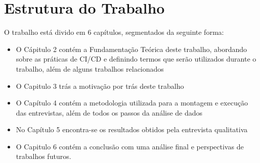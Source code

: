 \section{Estrutura do Trabalho}
 O trabalho está divido em 6 capítulos, segmentados da seguinte forma:

 \begin{itemize}
     \item O Cápitulo 2 contém a Fundamentação Teórica deste trabalho, abordando sobre as práticas de CI/CD e definindo termos que serão utilizados durante o trabalho, além de alguns trabalhos relacionados
     \item O Capitulo 3 trás a motivação por trás deste trabalho
     \item O Capítulo 4 contém a metodologia utilizada para a montagem e execução das entrevistas, além de todos os passos da análise de dados
     \item No Capítulo 5 encontra-se os resultados obtidos pela entrevista qualitativa
     \item O Capitulo 6 contém a conclusão com uma análise final e perspectivas de trabalhos futuros.
 \end{itemize}
